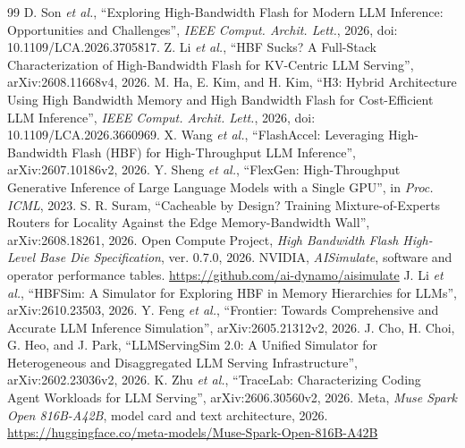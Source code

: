 \newcommand{\papertitle}[1]{\textquotedblleft#1\textquotedblright}
\begin{thebibliography}{99}
 D. Son \emph{et al.}, \papertitle{Exploring High-Bandwidth Flash for Modern LLM Inference: Opportunities and Challenges}, \emph{IEEE Comput. Archit. Lett.}, 2026, doi: 10.1109/LCA.2026.3705817.
 Z. Li \emph{et al.}, \papertitle{HBF Sucks? A Full-Stack Characterization of High-Bandwidth Flash for KV-Centric LLM Serving}, arXiv:2608.11668v4, 2026.
 M. Ha, E. Kim, and H. Kim, \papertitle{H3: Hybrid Architecture Using High Bandwidth Memory and High Bandwidth Flash for Cost-Efficient LLM Inference}, \emph{IEEE Comput. Archit. Lett.}, 2026, doi: 10.1109/LCA.2026.3660969.
 X. Wang \emph{et al.}, \papertitle{FlashAccel: Leveraging High-Bandwidth Flash (HBF) for High-Throughput LLM Inference}, arXiv:2607.10186v2, 2026.
 Y. Sheng \emph{et al.}, \papertitle{FlexGen: High-Throughput Generative Inference of Large Language Models with a Single GPU}, in \emph{Proc. ICML}, 2023.
 S. R. Suram, \papertitle{Cacheable by Design? Training Mixture-of-Experts Routers for Locality Against the Edge Memory-Bandwidth Wall}, arXiv:2608.18261, 2026.
 Open Compute Project, \emph{High Bandwidth Flash High-Level Base Die Specification}, ver. 0.7.0, 2026.
 NVIDIA, \emph{AISimulate}, software and operator performance tables. \url{https://github.com/ai-dynamo/aisimulate}
 J. Li \emph{et al.}, \papertitle{HBFSim: A Simulator for Exploring HBF in Memory Hierarchies for LLMs}, arXiv:2610.23503, 2026.
 Y. Feng \emph{et al.}, \papertitle{Frontier: Towards Comprehensive and Accurate LLM Inference Simulation}, arXiv:2605.21312v2, 2026.
 J. Cho, H. Choi, G. Heo, and J. Park, \papertitle{LLMServingSim 2.0: A Unified Simulator for Heterogeneous and Disaggregated LLM Serving Infrastructure}, arXiv:2602.23036v2, 2026.
 K. Zhu \emph{et al.}, \papertitle{TraceLab: Characterizing Coding Agent Workloads for LLM Serving}, arXiv:2606.30560v2, 2026.
 Meta, \emph{Muse Spark Open 816B-A42B}, model card and text architecture, 2026. \url{https://huggingface.co/meta-models/Muse-Spark-Open-816B-A42B}
\end{thebibliography}
